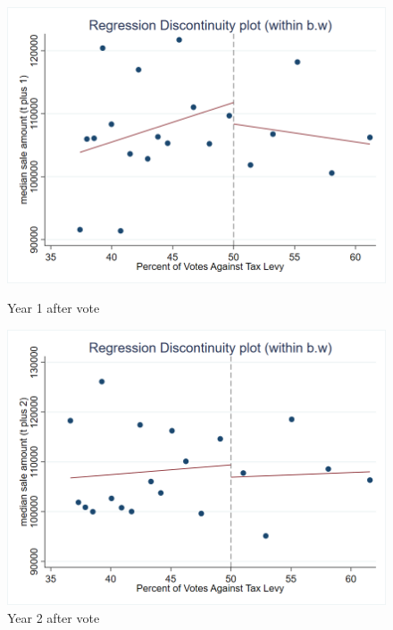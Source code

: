 \begin{figure}[ht]
    \centering
    \begin{minipage}[b]{0.48\textwidth}
        \centering
        \includegraphics[width=\textwidth,keepaspectratio]{images/rd_plot_median_sale_amount_t_plus_1_tri_mserd_1_2_within.png}
        \caption*{Year 1 after vote}
        \label{fig:hp_year1_after}
    \end{minipage}
    \hfill
    \begin{minipage}[b]{0.48\textwidth}
        \centering
        \includegraphics[width=\textwidth,keepaspectratio]{images/rd_plot_median_sale_amount_t_plus_2_tri_mserd_1_2_within.png}
        \caption*{Year 2 after vote}
        \label{fig:hp_year2_after}
    \end{minipage}
    

\end{figure}
